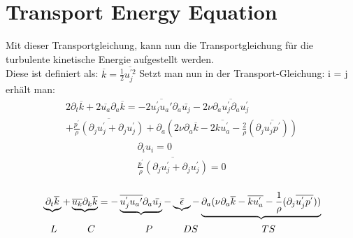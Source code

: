 \documentclass[11pt,t]{beamer}
\newcommand*\mean[1]{\overline{#1}}
\begin{document}
\section{Transport Energy Equation}
\begin{frame}
Mit dieser Transportgleichung, kann nun die Transportgleichung für die turbulente kinetische Energie aufgestellt werden.\\
Diese ist definiert als: $\mean{k} = \frac{1}{2}\mean{u_j^{'2}}$
Setzt man nun in der Transport-Gleichung: i = j erhält man:
\begin{align*}
2\partial_t \mean{k} + 2\mean{u_a}\partial_a \mean{k} = -2\overline{u_j^{'}u_a{'}}\partial_a\bar{u_j}
- 2\nu\overline{\partial_au_j^{'}\partial_au_j^{'}}\\+\overline{\frac{p^{'}}{\rho}(\partial_ju_j^{'}+\partial_ju_j^{'})}+\partial_a (2\nu\partial_a\overline{k} -2\overline{k u_a^{'}}-\frac{2}{\rho}(\partial_j\overline{u_j^{'}p^{'}}))
\end{align*}
\begin{align*}
\partial_i u_i = 0\\
\overline{\frac{p^{'}}{\rho}(\partial_ju_j^{'}+\partial_ju_j^{'})} = 0 \\
\end{align*}
\end{frame}
\begin{frame}
\begin{align*}
&\underbrace{\partial_t \mean{k}} + \underbrace{\mean{u_k}\partial_k \mean{k}} = -\underbrace{\overline{u_j^{'}u_a{'}}\partial_a\bar{u_j}}- \underbrace{\bar{\epsilon}} - \underbrace{\partial_a (\nu\partial_a\overline{k} -\overline{k u_a^{'}}-\frac{1}{\rho}(\partial_j\overline{u_j^{'}p^{'}}))}\\
&\hspace{0.3cm}L \hspace{1.1cm}C \hspace{1.8cm}P\hspace{1.1cm} DS \hspace{2.3cm}TS\\
\end{align*}
\end{frame}
\end{document}
